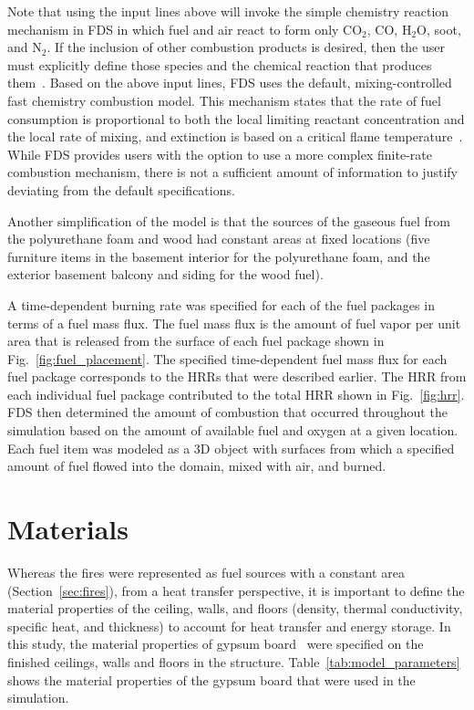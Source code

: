 \documentclass[12pt,oneside]{book}
\begin{document}
Note that using the input lines above will invoke the simple chemistry reaction mechanism in FDS in which fuel and air react to form only CO$_2$, CO, H$_2$O, soot, and N$_2$. If the inclusion of other combustion products is desired, then the user must explicitly define those species and the chemical reaction that produces them~\cite{FDS_Users_Guide}. Based on the above input lines, FDS uses the default, mixing-controlled fast chemistry combustion model. This mechanism states that the rate of fuel consumption is proportional to both the local limiting reactant concentration and the local rate of mixing, and extinction is based on a critical flame temperature~\cite{FDS_Math_Guide}. While FDS provides users with the option to use a more complex finite-rate combustion mechanism, there is not a sufficient amount of information to justify deviating from the default specifications.

Another simplification of the model is that the sources of the gaseous fuel from the polyurethane foam and wood had constant areas at fixed locations (five furniture items in the basement interior for the polyurethane foam, and the exterior basement balcony and siding for the wood fuel).

A time-dependent burning rate was specified for each of the fuel packages in terms of a fuel mass flux. The fuel mass flux is the amount of fuel vapor per unit area that is released from the surface of each fuel package shown in Fig.~\ref{fig:fuel_placement}. The specified time-dependent fuel mass flux for each fuel package corresponds to the HRRs that were described earlier. The HRR from each individual fuel package contributed to the total HRR shown in Fig.~\ref{fig:hrr}. FDS then determined the amount of combustion that occurred throughout the simulation based on the amount of available fuel and oxygen at a given location. Each fuel item was modeled as a 3D object with surfaces from which a specified amount of fuel flowed into the domain, mixed with air, and burned.

\section{Materials}
\label{sec:materials}

Whereas the fires were represented as fuel sources with a constant area (Section~\ref{sec:fires}), from a heat transfer perspective, it is important to define the material properties of the ceiling, walls, and floors (density, thermal conductivity, specific heat, and thickness) to account for heat transfer and energy storage. In this study, the material properties of gypsum board~\cite{WAKILI2007} were specified on the finished ceilings, walls and floors in the structure. Table~\ref{tab:model_parameters} shows the material properties of the gypsum board that were used in the simulation.
\end{document}
